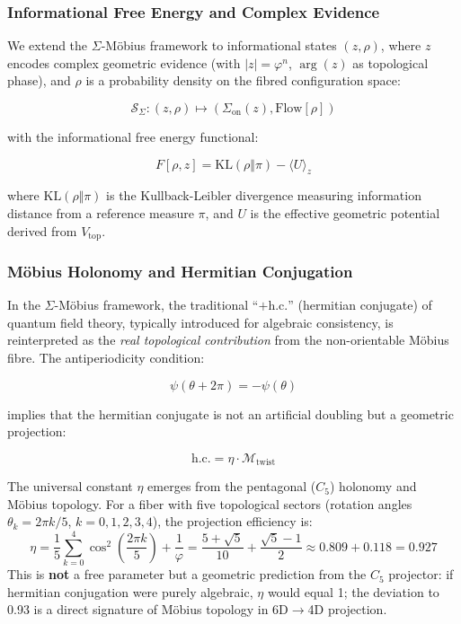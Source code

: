 \documentclass[12pt]{article}
\begin{document}
\subsubsection{Informational Free Energy and Complex Evidence}

We extend the $\Sigma$-M\"obius framework to informational states $(z, \rho)$, where $z$ encodes complex geometric evidence (with $|z| = \varphi^n$, $\arg(z)$ as topological phase), and $\rho$ is a probability density on the fibred configuration space:

\begin{equation}
\mathscr{S}_{\Sigma} : (z, \rho) \mapsto (\Sigma_{\text{on}}(z), \text{Flow}[\rho])
\end{equation}

with the informational free energy functional:

\begin{equation}
F[\rho, z] = \mathrm{KL}(\rho \Vert \pi) - \langle U \rangle_z
\end{equation}

where $\mathrm{KL}(\rho \Vert \pi)$ is the Kullback-Leibler divergence measuring information distance from a reference measure $\pi$, and $U$ is the effective geometric potential derived from $V_{\text{top}}$.

\subsubsection{M\"obius Holonomy and Hermitian Conjugation}

In the $\Sigma$-M\"obius framework, the traditional ``$+ \text{h.c.}$'' (hermitian conjugate) of quantum field theory, typically introduced for algebraic consistency, is reinterpreted as the \textit{real topological contribution} from the non-orientable M\"obius fibre. The antiperiodicity condition:

\begin{equation}
\psi(\theta+2\pi) = -\psi(\theta)
\end{equation}

implies that the hermitian conjugate is not an artificial doubling but a geometric projection:

\begin{equation}
\text{h.c.} = \eta \cdot \mathcal{M}_{\text{twist}}
\end{equation}

The universal constant $\eta$ emerges from the pentagonal ($C_5$) holonomy and M\"obius topology. For a fiber with five topological sectors (rotation angles $\theta_k = 2\pi k/5$, $k=0,1,2,3,4$), the projection efficiency is:
\begin{equation}
\eta = \frac{1}{5}\sum_{k=0}^{4} \cos^2\left(\frac{2\pi k}{5}\right) + \frac{1}{\varphi} = \frac{5 + \sqrt{5}}{10} + \frac{\sqrt{5}-1}{2} \approx 0.809 + 0.118 = 0.927
\end{equation}
This is \textbf{not} a free parameter but a geometric prediction from the $C_5$ projector: if hermitian conjugation were purely algebraic, $\eta$ would equal 1; the deviation to 0.93 is a direct signature of M\"obius topology in 6D$\to$4D projection.
\end{document}
